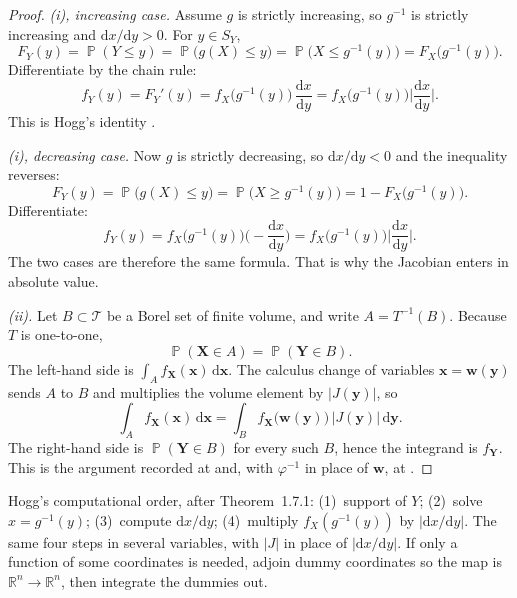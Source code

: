 \documentclass[11pt,a4paper]{article}
\DeclareMathOperator{\Pbb}{\mathbb{P}}
\begin{document}
\begin{proof}
\emph{(i), increasing case.} Assume \(g\) is strictly increasing, so \(g^{-1}\) is strictly increasing and \(\mathrm{d}x/\mathrm{d}y>0\). For \(y\in S_Y\),
\[
F_Y(y)
=
\Pbb(Y\le y)
=
\Pbb\bigl(g(X)\le y\bigr)
=
\Pbb\bigl(X\le g^{-1}(y)\bigr)
=
F_X\bigl(g^{-1}(y)\bigr).
\]
Differentiate by the chain rule:
\[
f_Y(y)
=
F_Y'(y)
=
f_X\bigl(g^{-1}(y)\bigr)\,
\frac{\mathrm{d}x}{\mathrm{d}y}
=
f_X\bigl(g^{-1}(y)\bigr)
\biggl|\frac{\mathrm{d}x}{\mathrm{d}y}\biggr|.
\]
This is Hogg's identity \citep[(1.7.12)--(1.7.13)]{hogg2019}.

\emph{(i), decreasing case.} Now \(g\) is strictly decreasing, so \(\mathrm{d}x/\mathrm{d}y<0\) and the inequality reverses:
\[
F_Y(y)
=
\Pbb\bigl(g(X)\le y\bigr)
=
\Pbb\bigl(X\ge g^{-1}(y)\bigr)
=
1-F_X\bigl(g^{-1}(y)\bigr).
\]
Differentiate:
\[
f_Y(y)
=
f_X\bigl(g^{-1}(y)\bigr)
\biggl(-\frac{\mathrm{d}x}{\mathrm{d}y}\biggr)
=
f_X\bigl(g^{-1}(y)\bigr)
\biggl|\frac{\mathrm{d}x}{\mathrm{d}y}\biggr|.
\]
The two cases are therefore the same formula. That is why the Jacobian enters in absolute value.

\emph{(ii).} Let \(B\subset\mathcal{T}\) be a Borel set of finite volume, and write \(A=T^{-1}(B)\). Because \(T\) is one-to-one,
\[
\Pbb(\mathbf{X}\in A)
=
\Pbb(\mathbf{Y}\in B).
\]
The left-hand side is \(\int_A f_{\mathbf{X}}(\mathbf{x})\,\mathrm{d}\mathbf{x}\). The calculus change of variables \(\mathbf{x}=\mathbf{w}(\mathbf{y})\) sends \(A\) to \(B\) and multiplies the volume element by \(|J(\mathbf{y})|\), so
\[
\int_A f_{\mathbf{X}}(\mathbf{x})\,\mathrm{d}\mathbf{x}
=
\int_B f_{\mathbf{X}}\bigl(\mathbf{w}(\mathbf{y})\bigr)\,
\bigl|J(\mathbf{y})\bigr|\,\mathrm{d}\mathbf{y}.
\]
The right-hand side is \(\Pbb(\mathbf{Y}\in B)\) for every such \(B\), hence the integrand is \(f_{\mathbf{Y}}\). This is the argument recorded at \citep[\S2.2]{hogg2019} and, with \(\varphi^{-1}\) in place of \(\mathbf{w}\), at \citep[\S4.8]{ren2024}.
\end{proof}

Hogg's computational order, after Theorem~1.7.1: (1)~support of \(Y\); (2)~solve \(x=g^{-1}(y)\); (3)~compute \(\mathrm{d}x/\mathrm{d}y\); (4)~multiply \(f_X(g^{-1}(y))\) by \(|\mathrm{d}x/\mathrm{d}y|\). The same four steps in several variables, with \(|J|\) in place of \(|\mathrm{d}x/\mathrm{d}y|\). If only a function of some coordinates is needed, adjoin dummy coordinates so the map is \(\mathbb{R}^n\to\mathbb{R}^n\), then integrate the dummies out.
\end{document}
